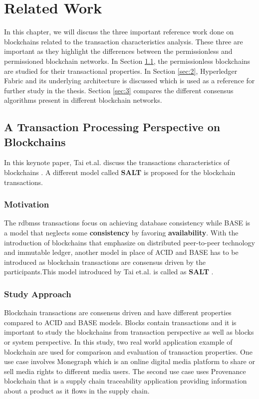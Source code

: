\documentclass[
  a4paper,  %
  twoside,  %
  bibliography=totoc,
  headsepline,
  cleardoublepage=empty,
  parskip=half,
  draft=false
]{scrbook}
\begin{document}
\chapter{Related Work}
\label{chap:rel}
In this chapter, we will discuss the three important reference work done on blockchains related to the transaction characteristics analysis. These three are important as they highlight the differences between the permissionless and permissioned blockchain networks. In Section \ref{sec:1}, the permissionless blockchains are studied for their transactional properties. In Section \ref{sec:2}, Hyperledger Fabric and its underlying architecture is discussed which is used as a reference for further study in the thesis. Section \ref{sec:3} compares the different consensus algorithms present in different blockchain networks.

\section{A Transaction Processing Perspective on Blockchains}
\label{sec:1}
In this keynote paper, Tai et.al. discuss the transactions characteristics of blockchains \cite{Salt}. A different model called \textbf{SALT} is proposed for the blockchain transactions.

\subsection{Motivation}
The \glspl{rdbms} transactions focus on achieving database consistency while BASE is a model that neglects some \textbf{consistency} by favoring \textbf{availability}. With the introduction of blockchains that emphasize on distributed peer-to-peer technology and immutable ledger, another model in place of ACID and BASE has to be introduced as blockchain transactions are consensus driven by the participants.This model introduced by Tai et.al. is called as \textbf{SALT} \cite{Salt}.

\subsection{Study Approach}
Blockchain transactions are consensus driven and have different properties compared to ACID and BASE models. Blocks contain transactions and it is important to study the blockchains from transaction perspective as well as blocks or system perspective. In this study, two real world application example of blockchain are used for comparison and evaluation of transaction properties. One use case involves Monegraph \cite{mon} which is an online digital media platform to share or sell media rights to different media users. The second use case uses Provenance blockchain \cite{pro} that is a supply chain traceability  application providing information about a product as it flows in the supply chain. 
\end{document}
